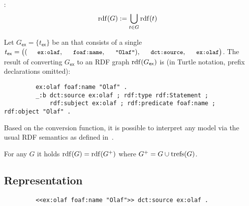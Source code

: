 \noindent
{}:
\begin{equation*}
	\mathrm{rdf}(G) := \bigcup_{t \in G} \mathrm{rdf}(t)
\end{equation*}

\begin{example}
	Let $G_\mathsf{ex} = \lbrace t_\mathsf{ex} \rbrace$ be an {\RDFplusGraph} that consists of a single {\RDFplusTriple} $t_\mathsf{ex} = \bigl( (\mathTinyRDF{ex:olaf},\mathTinyRDF{foaf:name},\mathTinyRDF{"Olaf"}), \mathTinyRDF{dct:source}, \mathTinyRDF{ex:olaf} \bigr)$.
	The result of converting $G_\mathsf{ex}$ to an RDF graph $\mathrm{rdf}(G_\mathsf{ex})$ is (in Turtle notation, prefix declarations omitted):
	\begin{footnotesize}%
	\begin{verbatim}
		 ex:olaf foaf:name "Olaf" .
		 _:b dct:source ex:olaf ; rdf:type rdf:Statement ;
		     rdf:subject ex:olaf ; rdf:predicate foaf:name ; rdf:object "Olaf" .
	\end{verbatim}%
	\end{footnotesize}
\end{example}

\noindent
Based on the conversion function, it is possible to interpret any {\RDFplus} model via the usual RDF semantics as defined in~\cite{Hayes04:RDFsemantics}.

\begin{proposition}
	For any {\RDFplusGraph} $G$ it holds $\mathrm{rdf}(G) = \mathrm{rdf}(G^+)$ where $G^+ = G \cup \mathrm{trefs}(G)$.
\end{proposition}


\subsection{Representation}

	\begin{footnotesize}%
	\begin{verbatim}
		 <<ex:olaf foaf:name "Olaf">> dct:source ex:olaf .
	\end{verbatim}%
	\end{footnotesize}

